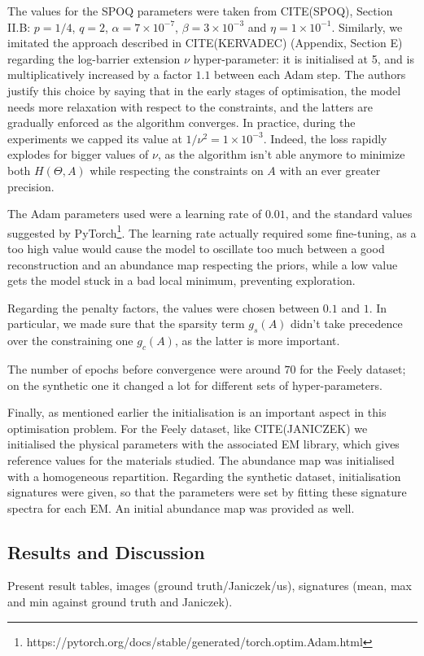 \documentclass{article}
\begin{document}
The values for the SPOQ parameters were taken from CITE(SPOQ), Section II.B: $p=1/4$, $q=2$, $\alpha=7 \times 10^{-7}$, $\beta = 3 \times 10^{-3}$ and $\eta= 1 \times 10^{-1}$. Similarly, we imitated the approach described in CITE(KERVADEC) (Appendix, Section E) regarding the log-barrier extension $\nu$ hyper-parameter: it is initialised at 5, and is multiplicatively increased by a factor $1.1$ between each Adam step. The authors justify this choice by saying that in the early stages of optimisation, the model needs more relaxation with respect to the constraints, and the latters are gradually enforced as the algorithm converges. In practice, during the experiments we capped its value at $1/\nu^2 = 1 \times 10^{-3}$. Indeed, the loss rapidly explodes for bigger values of $\nu$, as the algorithm isn't able anymore to minimize both $H(\Theta, A)$ while respecting the constraints on $A$ with an ever greater precision.

The Adam parameters used were a learning rate of $0.01$, and the standard values suggested by \textsf{PyTorch}\footnote{https://pytorch.org/docs/stable/generated/torch.optim.Adam.html}. The learning rate actually required some fine-tuning, as a too high value would cause the model to oscillate too much between a good reconstruction and an abundance map respecting the priors, while a low value gets the model stuck in a bad local minimum, preventing exploration.

Regarding the penalty factors, the values were chosen between $0.1$ and $1$. In particular, we made sure that the sparsity term $g_s(A)$ didn't take precedence over the constraining one $g_c(A)$, as the latter is more important.

The number of epochs before convergence were around $70$ for the Feely dataset; on the synthetic one it changed a lot for different sets of hyper-parameters.

Finally, as mentioned earlier the initialisation is an important aspect in this optimisation problem. For the Feely dataset, like CITE(JANICZEK) we initialised the physical parameters with the associated EM library, which gives reference values for the materials studied. The abundance map was initialised with a homogeneous repartition. Regarding the synthetic dataset, initialisation signatures were given, so that the parameters were set by fitting these signature spectra for each EM. An initial abundance map was provided as well.

\subsection{Results and Discussion}
Present result tables, images (ground truth/Janiczek/us), signatures (mean, max and min against ground truth and Janiczek).
\end{document}
